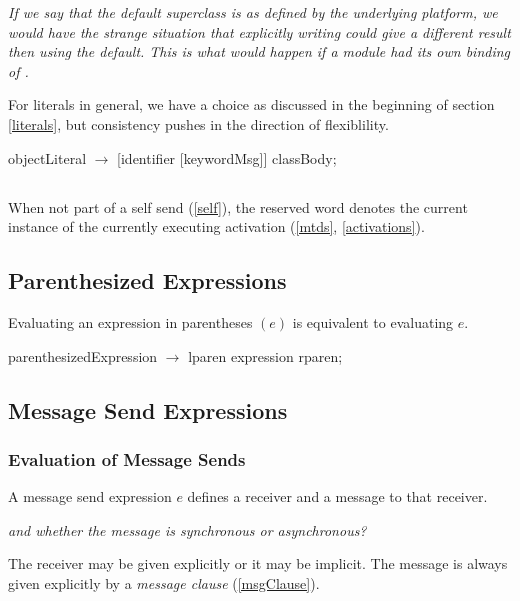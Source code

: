 \documentclass{article}
\begin{document}
 {\it
If we say that the default superclass is  as defined by the underlying platform, we would have the strange situation that explicitly writing  could give a different result then using the default.
This is what would happen if  a module had its own binding of . 

For literals in general, we have a choice as discussed in the beginning of section \ref{literals}, but consistency pushes in the direction of flexiblility.
}

\begin{newspeak}
objectLiteral $\rightarrow$ [identifier [keywordMsg]]  classBody;
\end{newspeak}


\subsection{\SELF} 
\label{selfKw}

When not part of a self send (\ref{self}), the reserved word  \SELF{} denotes  the current instance of the currently executing activation (\ref{mtds}, \ref{activations}). 

\subsection{Parenthesized Expressions}
\label{parens}

Evaluating an expression in parentheses $(e)$ is equivalent to evaluating $e$.

\begin{newspeak}
parenthesizedExpression $\rightarrow$  lparen expression rparen;
\end{newspeak}

\subsection{Message Send Expressions}
\label{sends}

\subsubsection{Evaluation of Message Sends}
\label{evalMsg}

A message send expression $e$ defines a receiver and a message to that receiver.

{\it and whether the message is  synchronous or asynchronous?}

The receiver may be given explicitly or it may be implicit. The message is always given explicitly by a {\em message clause} (\ref{msgClause}).  
\end{document}
